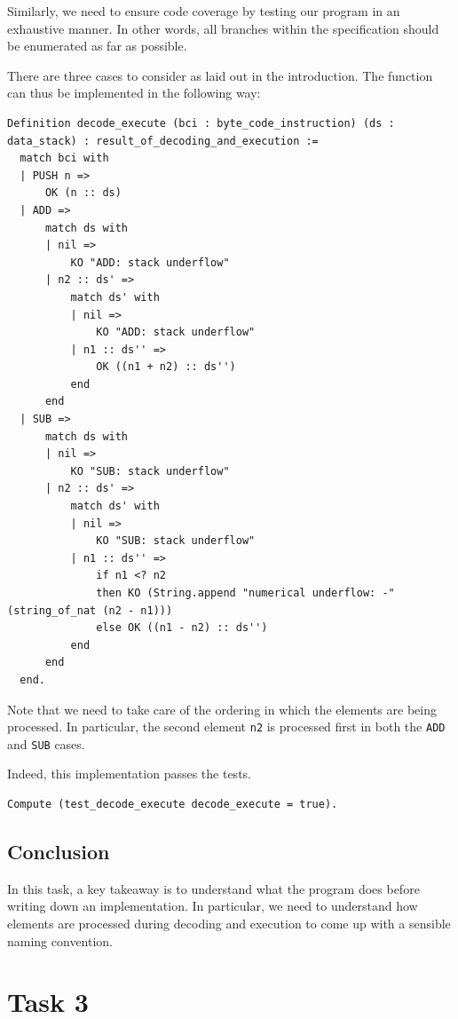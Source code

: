 \documentclass{article}
\begin{document}
Similarly, we need to ensure code coverage by testing our program in an exhaustive manner. In other words, all branches within the specification should be enumerated as far as possible.

There are three cases to consider as laid out in the introduction. The function can thus be implemented in the following way:

\begin{lstlisting}
Definition decode_execute (bci : byte_code_instruction) (ds : data_stack) : result_of_decoding_and_execution :=
  match bci with
  | PUSH n =>
      OK (n :: ds)
  | ADD =>
      match ds with
      | nil =>
          KO "ADD: stack underflow"
      | n2 :: ds' =>
          match ds' with
          | nil =>
              KO "ADD: stack underflow"
          | n1 :: ds'' =>
              OK ((n1 + n2) :: ds'')
          end
      end
  | SUB =>
      match ds with
      | nil =>
          KO "SUB: stack underflow"
      | n2 :: ds' =>
          match ds' with
          | nil =>
              KO "SUB: stack underflow"
          | n1 :: ds'' =>
              if n1 <? n2 
              then KO (String.append "numerical underflow: -" (string_of_nat (n2 - n1)))
              else OK ((n1 - n2) :: ds'')
          end
      end
  end.
\end{lstlisting}

Note that we need to take care of the ordering in which the elements are being processed. In particular, the second element \texttt{n2} is processed first in both the \texttt{ADD} and \texttt{SUB} cases.

Indeed, this implementation passes the tests.

\begin{lstlisting}
Compute (test_decode_execute decode_execute = true).
\end{lstlisting}

\subsection{Conclusion}
In this task, a key takeaway is to understand what the program does before writing down an implementation. In particular, we need to understand how elements are processed during decoding and execution to come up with a sensible naming convention. 

\section{Task 3}
\end{document}
